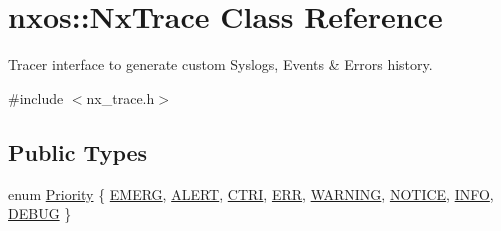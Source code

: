 \hypertarget{classnxos_1_1_nx_trace}{}\section{nxos\+:\+:Nx\+Trace Class Reference}
\label{classnxos_1_1_nx_trace}


Tracer interface to generate custom Syslogs, Events \& Errors history.  




{\ttfamily \#include $<$nx\+\_\+trace.\+h$>$}

\subsection*{Public Types}
\begin{DoxyCompactItemize}
\item 
enum \mbox{\hyperlink{classnxos_1_1_nx_trace_a582f6e5a22e788c61807657f8bca088f}{Priority}} \{ \newline
\mbox{\hyperlink{classnxos_1_1_nx_trace_a582f6e5a22e788c61807657f8bca088fa162b57da846293468dd47af10c603df2}{E\+M\+E\+RG}}, 
\mbox{\hyperlink{classnxos_1_1_nx_trace_a582f6e5a22e788c61807657f8bca088fa8733d052a42f110d6638988de5b6e4e4}{A\+L\+E\+RT}}, 
\mbox{\hyperlink{classnxos_1_1_nx_trace_a582f6e5a22e788c61807657f8bca088fad47bf23377867d39c4d53d2b2689b4da}{C\+T\+RI}}, 
\mbox{\hyperlink{classnxos_1_1_nx_trace_a582f6e5a22e788c61807657f8bca088faeac0f6db2341c975bf8e46d34496eb08}{E\+RR}}, 
\newline
\mbox{\hyperlink{classnxos_1_1_nx_trace_a582f6e5a22e788c61807657f8bca088fab187ad33eec7a961a9b1f3c787ecd003}{W\+A\+R\+N\+I\+NG}}, 
\mbox{\hyperlink{classnxos_1_1_nx_trace_a582f6e5a22e788c61807657f8bca088fac0c5faafc7a08a2bb2388c2d6c670936}{N\+O\+T\+I\+CE}}, 
\mbox{\hyperlink{classnxos_1_1_nx_trace_a582f6e5a22e788c61807657f8bca088fae821a1cd215dd3a51942abd8af16f36e}{I\+N\+FO}}, 
\mbox{\hyperlink{classnxos_1_1_nx_trace_a582f6e5a22e788c61807657f8bca088faa682e4987de0b7ca5b5474c68bbf9d4e}{D\+E\+B\+UG}}
 \}
\end{DoxyCompactItemize}
